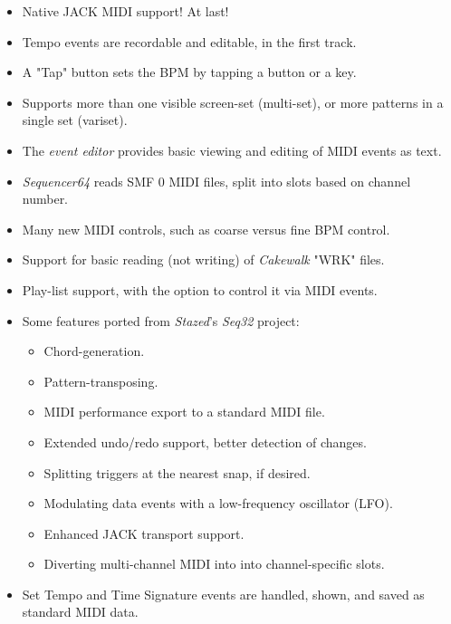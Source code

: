 \documentclass[
 11pt,
 twoside,
 a4paper,
 headinclude,
 footinclude,
 final                                 %
]{article}
\begin{document}
   \begin{itemize}
      \item Native JACK MIDI support!  At last!
      \item Tempo events are recordable and editable, in the first track.
      \item A "Tap" button sets the BPM by tapping a button or a key.
      \item Supports more than one visible screen-set (multi-set),
         or more patterns in a single set (variset).
      \item The \textsl{event editor}
         provides basic viewing and editing of MIDI events as text.
      \item \textsl{Sequencer64} reads SMF 0 MIDI files, split
         into slots based on channel number.
      \item Many new MIDI controls, such as coarse versus fine BPM control.
      \item Support for basic reading (not writing) of
         \textsl{Cakewalk} "WRK" files.
      \item Play-list support, with the option to control it via MIDI events.
      \item Some features ported from \textsl{Stazed}'s
         \textsl{Seq32} \cite{seq32} project:
         \begin{itemize}
            \item Chord-generation.
            \item Pattern-transposing.
            \item MIDI performance export to a standard MIDI file.
            \item Extended undo/redo support, better detection of changes.
            \item Splitting triggers at the nearest snap, if desired.
            \item Modulating data events with a low-frequency oscillator (LFO).
            \item Enhanced JACK transport support.
            \item Diverting multi-channel MIDI into into channel-specific slots.
         \end{itemize}
      \item Set Tempo and Time Signature events are handled,
         shown, and saved as standard MIDI data.

\end{itemize}
\end{document}
